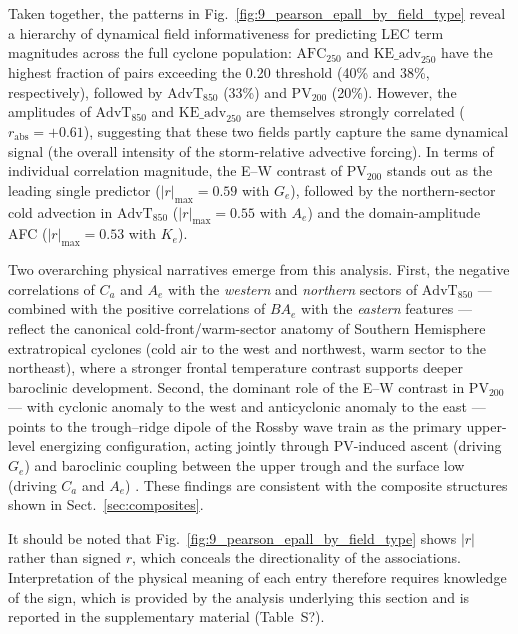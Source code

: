 
Taken together, the patterns in Fig.~\ref{fig:9_pearson_epall_by_field_type} reveal a
hierarchy of dynamical field informativeness for predicting LEC term magnitudes across
the full cyclone population: $\mathrm{AFC}_{250}$ and $\mathrm{KE\_adv}_{250}$ have
the highest fraction of pairs exceeding the 0.20 threshold (40\% and 38\%,
respectively), followed by $\mathrm{AdvT}_{850}$ (33\%) and $\mathrm{PV}_{200}$ (20\%).
However, the amplitudes of $\mathrm{AdvT}_{850}$ and $\mathrm{KE\_adv}_{250}$ are
themselves strongly correlated ($r_{\mathrm{abs}} = +0.61$), suggesting that these two
fields partly capture the same dynamical signal (the overall intensity of the
storm-relative advective forcing). In terms of individual correlation magnitude,
the E–W contrast of $\mathrm{PV}_{200}$ stands out as the leading single predictor
($|r|_{\max} = 0.59$ with $G_e$), followed by the northern-sector cold advection in
$\mathrm{AdvT}_{850}$ ($|r|_{\max} = 0.55$ with $A_e$) and the domain-amplitude AFC
($|r|_{\max} = 0.53$ with $K_e$).

Two overarching physical narratives emerge from this analysis. First, the negative
correlations of $C_a$ and $A_e$ with the \emph{western} and \emph{northern} sectors
of $\mathrm{AdvT}_{850}$ — combined with the positive correlations of $BA_e$ with
the \emph{eastern} features — reflect the canonical cold-front/warm-sector anatomy of
Southern Hemisphere extratropical cyclones (cold air to the west and northwest, warm
sector to the northeast), where a stronger frontal temperature contrast supports deeper
baroclinic development. Second, the dominant role of the E–W contrast in
$\mathrm{PV}_{200}$ — with cyclonic anomaly to the west and anticyclonic anomaly to
the east — points to the trough–ridge dipole of the Rossby wave train as the primary
upper-level energizing configuration, acting jointly through PV-induced ascent
(driving $G_e$) and baroclinic coupling between the upper trough and the surface low
(driving $C_a$ and $A_e$) \citep{hoskins1985use,davies2015quasigeostrophic,de2025lorenz}.
These findings are consistent with the composite structures shown in
Sect.~\ref{sec:composites}.

It should be noted that Fig.~\ref{fig:9_pearson_epall_by_field_type} shows
$|r|$ rather than signed $r$, which conceals the directionality of the associations.
Interpretation of the physical meaning of each entry therefore requires knowledge of
the sign, which is provided by the analysis underlying this section and is reported in
the supplementary material (Table~S?).

